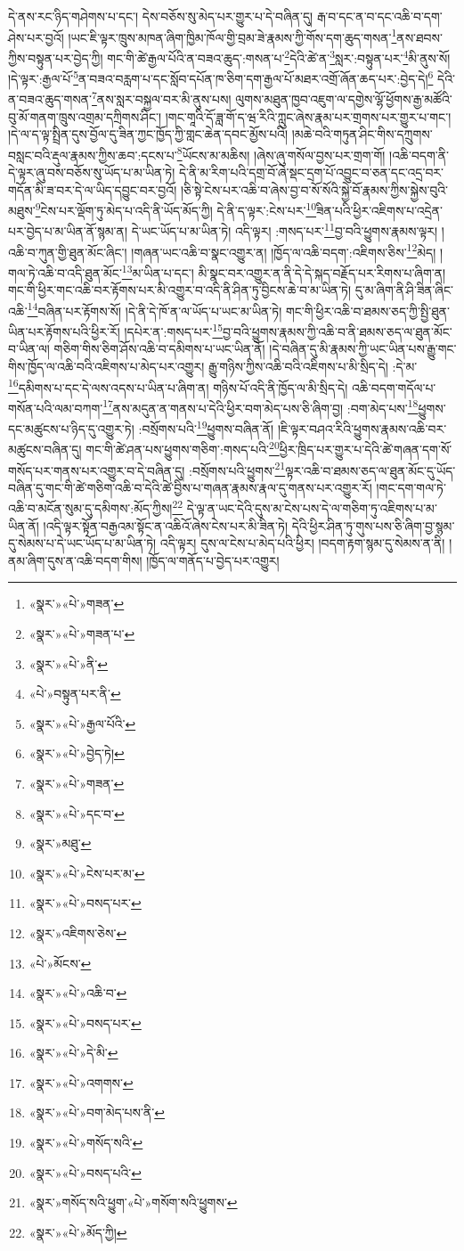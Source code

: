 དེ་ནས་རང་ཉིད་གཤེགས་པ་དང་། དེས་བཅོས་སུ་མེད་པར་གྱུར་པ་དེ་བཞིན་དུ། རྒ་བ་དང་ན་བ་དང་འཆི་བ་དག་ཤེས་པར་བྱའོ། །ཡང་ཇི་ལྟར་ཁྲུས་མཁན་ཞིག་ཁྱིམ་ཁོལ་གྱི་བྲམ་ཟེ་རྣམས་ཀྱི་གོས་དག་ཆུད་གསན་\footnote{«སྣར་»«པེ་»གཟན་}ནས་ཐབས་ཀྱིས་བསྟུན་པར་བྱེད་ཀྱི། གང་གི་ཚེ་རྒྱལ་པོའི་ན་བཟའ་ཆུད་:གསན་པ་\footnote{«སྣར་»«པེ་»གཟན་པ་}དེའི་ཚེ་ན་\footnote{«སྣར་»«པེ་»ནི་}སླར་:བསྟུན་པར་\footnote{«པེ་»བསྟུན་པར་ནི་}མི་ནུས་སོ། །དེ་ལྟར་:རྒྱལ་པོ་\footnote{«སྣར་»«པེ་»རྒྱལ་པོའི་}ན་བཟའ་བརླག་པ་དང་སློབ་དཔོན་ཁ་ཅིག་དག་རྒྱལ་པོ་མཐར་འགྲོ་ཞོན་ཆད་པར་:བྱེད་དེ།\footnote{«སྣར་»«པེ་»བྱེད་ཏེ།} དེའི་ན་བཟའ་ཆུད་གསན་\footnote{«སྣར་»«པེ་»གཟན་}ནས་སླར་བསྐྱལ་བར་མི་ནུས་པས། ལུགས་མཐུན་ཁྱབ་འཇུག་ལ་དགྱེས་ལྷོ་ཕྱོགས་རྒྱ་མཚོའི་བུ་མོ་གནག་ཁྲུས་འགྲམ་དཀྲིགས་ཤིང་། །གང་གཱའི་དོ་ཟླ་གོ་ད་ཝ་རིའི་ཀླུང་ཞེས་རྣམ་པར་གྲགས་པར་གྱུར་པ་གང་། །དེ་ལ་ད་ལྟ་སྤྲིན་དུས་བྱོལ་དུ་ཟིན་ཀྱང་ཁྱོད་ཀྱི་གླང་ཆེན་དབང་མྱོས་པའི། །མཆེ་བའི་གཏུན་ཤིང་གིས་དཀྲུགས་བསླང་བའི་རྡུལ་རྣམས་ཀྱིས་ཆབ་:དངས་པ་\footnote{«སྣར་»«པེ་»དང་བ་}ཡོངས་མ་མཆིས། །ཞེས་ཞུ་གསོལ་བྱས་པར་གྲག་གོ། །འཆི་བདག་ནི་དེ་ལྟར་ཞུ་བས་བཅོས་སུ་ཡོད་པ་མ་ཡིན་ཏེ། དེ་ནི་མ་རིག་པའི་དགྲ་བོ་ཞེ་སྡང་དྲག་པོ་འབྱུང་བ་ཅན་དང་འདྲ་བར་གདོན་མི་ཟ་བར་དེ་ལ་ཡིད་དབྱུང་བར་བྱའོ། །ཅི་སྟེ་ངེས་པར་འཆི་བ་ཞེས་བྱ་བ་སོ་སོའི་སྐྱེ་བོ་རྣམས་ཀྱིས་སྐྱེས་བུའི་མཐུས་\footnote{«སྣར་»མཐུ་}ངེས་པར་ལྡོག་ཏུ་མེད་པ་འདི་ནི་ཡོད་མོད་ཀྱི། དེ་ནི་ད་ལྟར་:ངེས་པར་\footnote{«སྣར་»«པེ་»ངེས་པར་མ་}ཟིན་པའི་ཕྱིར་འཇིགས་པ་འདྲེན་པར་བྱེད་པ་མ་ཡིན་ནོ་སྙམ་ན། དེ་ཡང་ཡོད་པ་མ་ཡིན་ཏེ། འདི་ལྟར། :གསད་པར་\footnote{«སྣར་»«པེ་»བསད་པར་}བྱ་བའི་ཕྱུགས་རྣམས་ལྟར། །འཆི་བ་ཀུན་གྱི་ཐུན་མོང་ཞིང་། །གཞན་ཡང་འཆི་བ་སྣང་འགྱུར་ན། །ཁྱོད་ལ་འཆི་བདག་:འཇིགས་ཅིས་\footnote{«སྣར་»འཇིགས་ཅེས་}མེད། །གལ་ཏེ་འཆི་བ་འདི་ཐུན་མོང་\footnote{«པེ་»མོངས་}མ་ཡིན་པ་དང་། མི་སྣང་བར་འགྱུར་ན་ནི་དེ་དེ་སྐད་བརྗོད་པར་རིགས་པ་ཞིག་ན། གང་གི་ཕྱིར་གང་འཆི་བར་རྟོགས་པར་མི་འགྱུར་བ་འདི་ནི་ཤིན་ཏུ་བྱིངས་ཆེ་བ་མ་ཡིན་ཏེ། དུ་མ་ཞིག་ནི་ཤི་ཟིན་ཞིང་འཆི་\footnote{«སྣར་»«པེ་»འཆི་བ་}བཞིན་པར་རྟོགས་སོ། །དེ་ནི་དེ་ཁོ་ན་ལ་ཡོད་པ་ཡང་མ་ཡིན་ཏེ། གང་གི་ཕྱིར་འཆི་བ་ཐམས་ཅད་ཀྱི་སྤྱི་ཐུན་ཡིན་པར་རྟོགས་པའི་ཕྱིར་རོ། །དཔེར་ན་:གསད་པར་\footnote{«སྣར་»«པེ་»བསད་པར་}བྱ་བའི་ཕྱུགས་རྣམས་ཀྱི་འཆི་བ་ནི་ཐམས་ཅད་ལ་ཐུན་མོང་བ་ཡིན་ལ། གཅིག་གིས་ཅིག་ཤོས་འཆི་བ་དམིགས་པ་ཡང་ཡིན་ནོ། །དེ་བཞིན་དུ་མི་རྣམས་ཀྱི་ཡང་ཡིན་པས་རྒྱུ་གང་གིས་ཁྱོད་ལ་འཆི་བའི་འཇིགས་པ་མེད་པར་འགྱུར། རྒྱུ་གཉིས་ཀྱིས་འཆི་བའི་འཇིགས་པ་མི་སྲིད་དེ། :དེ་མ་\footnote{«སྣར་»«པེ་»དེ་མི་}དམིགས་པ་དང་དེ་ལས་འདས་པ་ཡིན་པ་ཞིག་ན། གཉིས་པོ་འདི་ནི་ཁྱོད་ལ་མི་སྲིད་དེ། འཆི་བདག་གདོལ་པ་གསོན་པའི་ལམ་བཀག་\footnote{«སྣར་»«པེ་»འགགས་}ནས་མདུན་ན་གནས་པ་དེའི་ཕྱིར་བག་མེད་པས་ཅི་ཞིག་བྱ། :བག་མེད་པས་\footnote{«སྣར་»«པེ་»བག་མེད་པས་ནི་}ཕྱུགས་དང་མཚུངས་པ་ཉིད་དུ་འགྱུར་ཏེ། :བསྲོགས་པའི་\footnote{«སྣར་»«པེ་»གསོད་སའི་}ཕྱུགས་བཞིན་ནོ། །ཇི་ལྟར་བཤའ་རིའི་ཕྱུགས་རྣམས་འཆི་བར་མཚུངས་བཞིན་དུ། གང་གི་ཚེ་ཤན་པས་ཕྱུགས་གཅིག་:གསད་པའི་\footnote{«སྣར་»«པེ་»བསད་པའི་}ཕྱིར་ཁྲིད་པར་གྱུར་པ་དེའི་ཚེ་གཞན་དག་སོ་གསོད་པར་གནས་པར་འགྱུར་བ་དེ་བཞིན་དུ། :བསྲོགས་པའི་ཕྱུགས་\footnote{«སྣར་»གསོད་སའི་ཕྱུག་«པེ་»གསོག་སའི་ཕྱུགས་}ལྟར་འཆི་བ་ཐམས་ཅད་ལ་ཐུན་མོང་དུ་ཡོད་བཞིན་དུ་གང་གི་ཚེ་གཅིག་འཆི་བ་དེའི་ཚེ་བྱིས་པ་གཞན་རྣམས་རྣལ་དུ་གནས་པར་འགྱུར་རོ། །གང་དག་གལ་ཏེ་འཆི་བ་མངོན་སུམ་དུ་དམིགས་:མོད་ཀྱིས།\footnote{«སྣར་»«པེ་»མོད་ཀྱི།} དེ་ལྟ་ན་ཡང་དེའི་དུས་མ་ངེས་པས་དེ་ལ་གཅིག་ཏུ་འཇིགས་པ་མ་ཡིན་ནོ། །འདི་ལྟར་སྟོན་བརྒྱའམ་སྟོང་ན་འཆིའོ་ཞེས་ངེས་པར་མི་ཟིན་ཏེ། དེའི་ཕྱིར་ཤིན་ཏུ་གུས་པས་ཅི་ཞིག་བྱ་སྙམ་དུ་སེམས་པ་དེ་ཡང་ཡོད་པ་མ་ཡིན་ཏེ། འདི་ལྟར། དུས་ལ་ངེས་པ་མེད་པའི་ཕྱིར། །བདག་རྟག་སྙམ་དུ་སེམས་ན་ནི། །ནམ་ཞིག་དུས་ན་འཆི་བདག་གིས། །ཁྱོད་ལ་གནོད་པ་བྱེད་པར་འགྱུར། 